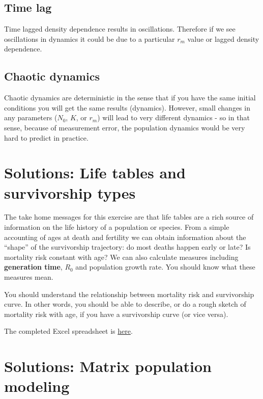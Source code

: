 \documentclass[
  a4paper]{book}
\begin{document}
\hypertarget{time-lag}{%
\subsection{Time lag}\label{time-lag}}

Time lagged density dependence results in oscillations. Therefore if we see oscillations in dynamics it could be due to a particular \(r_m\) value or lagged density dependence.

\hypertarget{chaotic-dynamics}{%
\subsection{Chaotic dynamics}\label{chaotic-dynamics}}

Chaotic dynamics are deterministic in the sense that if you have the same initial conditions you will get the same results (dynamics). However, small changes in any parameters (\(N_0\), \(K\), or \(r_m\)) will lead to very different dynamics - so in that sense, because of measurement error, the population dynamics would be very hard to predict in practice.

\hypertarget{solutions-life-tables-and-survivorship-types}{%
\section{Solutions: Life tables and survivorship types}\label{solutions-life-tables-and-survivorship-types}}

The take home messages for this exercise are that life tables are a rich source of information on the life history of a population or species. From a simple accounting of ages at death and fertility we can obtain information about the ``shape'' of the survivorship trajectory: do most deaths happen early or late? Is mortality risk constant with age? We can also calculate measures including \textbf{generation time}, \(R_0\) and population growth rate. You should know what these measures mean.

You should understand the relationship between mortality risk and survivorship curve. In other words, you should be able to describe, or do a rough sketch of mortality risk with age, if you have a survivorship curve (or vice versa).

The completed Excel spreadsheet is \href{https://www.dropbox.com/s/j8uv2wf7nz0ygmp/Life\%20tables\%20exercise\%20-\%20complete.xlsx?dl=1}{here}.

\hypertarget{solutions-matrix-population-modeling}{%
\section{Solutions: Matrix population modeling}\label{solutions-matrix-population-modeling}}
\end{document}
